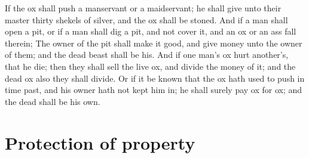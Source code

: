 \begin{biblechapter}
\verse If the ox shall push a manservant or a maidservant; he shall give unto their master thirty shekels of silver, and the ox shall be stoned.
\verse And if a man shall open a pit, or if a man shall dig a pit, and not cover it, and an ox or an ass fall therein;
\verse The owner of the pit shall make it good, and give money unto the owner of them; and the dead beast shall be his.
\verse And if one man's ox hurt another's, that he die; then they shall sell the live ox, and divide the money of it; and the dead ox also they shall divide.
\verse Or if it be known that the ox hath used to push in time past, and his owner hath not kept him in; he shall surely pay ox for ox; and the dead shall be his own.
\end{biblechapter}

\section*{Protection of property}
